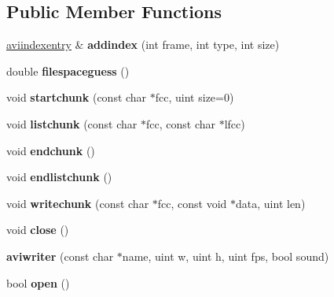 \subsection*{Public Member Functions}
\begin{DoxyCompactItemize}
\item 
\mbox{\label{structaviwriter_a77e098e4d2f631777c899cc60fc97228}} 
\hyperlink{structaviindexentry}{aviindexentry} \& {\bfseries addindex} (int frame, int type, int size)
\item 
\mbox{\label{structaviwriter_a925721c093e3d0b4d0c6fd9631f0dccd}} 
double {\bfseries filespaceguess} ()
\item 
\mbox{\label{structaviwriter_ad0fd578fdbe8f0829c4b48c6f6cb5029}} 
void {\bfseries startchunk} (const char $\ast$fcc, uint size=0)
\item 
\mbox{\label{structaviwriter_a93bd10b87e030c3ebcc398181e37913f}} 
void {\bfseries listchunk} (const char $\ast$fcc, const char $\ast$lfcc)
\item 
\mbox{\label{structaviwriter_a040a22049556269e810cd13079cda438}} 
void {\bfseries endchunk} ()
\item 
\mbox{\label{structaviwriter_ac18da2b770a119e0724ac33d1392b428}} 
void {\bfseries endlistchunk} ()
\item 
\mbox{\label{structaviwriter_ae9c7449da244dfb722ea6ad62f94fc81}} 
void {\bfseries writechunk} (const char $\ast$fcc, const void $\ast$data, uint len)
\item 
\mbox{\label{structaviwriter_ad92f56c6d0dc14d2de524ead38882434}} 
void {\bfseries close} ()
\item 
\mbox{\label{structaviwriter_ad48af40fa6e1038979f5f8d230fca47f}} 
{\bfseries aviwriter} (const char $\ast$name, uint w, uint h, uint fps, bool sound)
\item 
\mbox{\label{structaviwriter_a715ae6cc97a9c4d2cdf1c63a2c103f5e}} 
bool {\bfseries open} ()
\item 

\end{DoxyCompactItemize}
